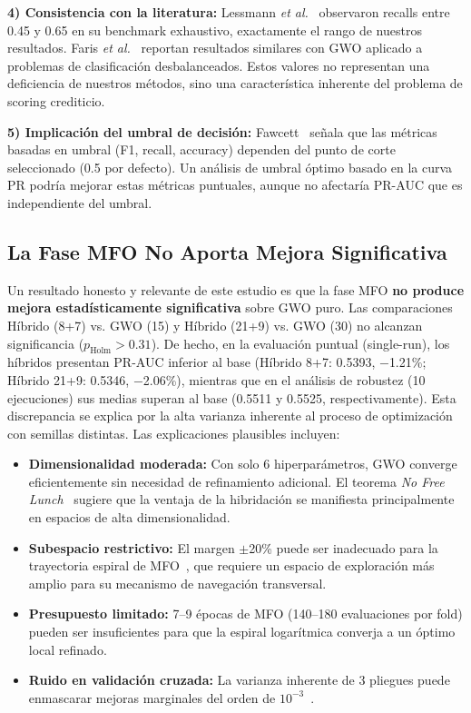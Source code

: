 \documentclass[journal]{IEEEtran}
\begin{document}
\textbf{4) Consistencia con la literatura:} Lessmann \textit{et al.}~\cite{lessmann2015} observaron recalls entre 0.45 y 0.65 en su benchmark exhaustivo, exactamente el rango de nuestros resultados. Faris \textit{et al.}~\cite{faris2018} reportan resultados similares con GWO aplicado a problemas de clasificación desbalanceados. Estos valores no representan una deficiencia de nuestros métodos, sino una característica inherente del problema de scoring crediticio.

\textbf{5) Implicación del umbral de decisión:} Fawcett~\cite{fawcett2006} señala que las métricas basadas en umbral (F1, recall, accuracy) dependen del punto de corte seleccionado (0.5 por defecto). Un análisis de umbral óptimo basado en la curva PR podría mejorar estas métricas puntuales, aunque no afectaría PR-AUC que es independiente del umbral.

\subsection{La Fase MFO No Aporta Mejora Significativa}
Un resultado honesto y relevante de este estudio es que la fase MFO \textbf{no produce mejora estadísticamente significativa} sobre GWO puro. Las comparaciones Híbrido (8+7) vs. GWO (15) y Híbrido (21+9) vs. GWO (30) no alcanzan significancia ($p_{\text{Holm}} > 0.31$). De hecho, en la evaluación puntual (single-run), los híbridos presentan PR-AUC inferior al base (Híbrido 8+7: 0.5393, $-$1.21\%; Híbrido 21+9: 0.5346, $-$2.06\%), mientras que en el análisis de robustez (10 ejecuciones) sus medias superan al base (0.5511 y 0.5525, respectivamente). Esta discrepancia se explica por la alta varianza inherente al proceso de optimización con semillas distintas. Las explicaciones plausibles incluyen:

\begin{itemize}[leftmargin=*]
    \item \textbf{Dimensionalidad moderada:} Con solo 6 hiperparámetros, GWO converge eficientemente sin necesidad de refinamiento adicional. El teorema \textit{No Free Lunch}~\cite{wolpert1997} sugiere que la ventaja de la hibridación se manifiesta principalmente en espacios de alta dimensionalidad.
    \item \textbf{Subespacio restrictivo:} El margen $\pm$20\% puede ser inadecuado para la trayectoria espiral de MFO~\cite{mirjalili2015}, que requiere un espacio de exploración más amplio para su mecanismo de navegación transversal.
    \item \textbf{Presupuesto limitado:} 7--9 épocas de MFO (140--180 evaluaciones por fold) pueden ser insuficientes para que la espiral logarítmica converja a un óptimo local refinado.
    \item \textbf{Ruido en validación cruzada:} La varianza inherente de 3 pliegues puede enmascarar mejoras marginales del orden de $10^{-3}$~\cite{demsar2006}.
\end{itemize}
\end{document}
